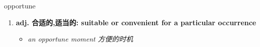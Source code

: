 
\begin{frame}
{\huge opportune}
\begin{center}
\begin{enumerate}\Large
  \item \textbf{adj. 合适的,适当的: suitable or convenient for a particular occurrence}
  \begin{itemize}
    \item \em{\Large{an opportune moment 方便的时机}}
  \end{itemize}
\end{enumerate}
\end{center}
\end{frame}
